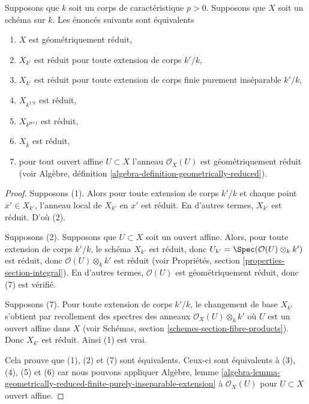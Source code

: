 \begin{lemma}
\label{lemma-geometrically-reduced}
Supposons que $k$ soit un corps de caractéristique $p > 0$. Supposons
que $X$ soit un schéma sur $k$. Les énoncés suivants sont équivalents
\begin{enumerate}
\item $X$ est géométriquement réduit, \item
$X_{k'}$ est réduit pour toute extension de
corps $k'/k$, \item $X_{k'}$ est réduit pour
toute extension de corps finie purement
inséparable $k'/k$, \item $X_{k^{1/p}}$ est
réduit, \item $X_{k^{perf}}$ est réduit, \item
$X_{\bar k}$ est réduit, \item pour tout ouvert
affine $U \subset X$ l'anneau $\mathcal{O}_X(U)$
est géométriquement réduit (voir Algèbre,
définition \ref{algebra-definition-geometrically-reduced}).
\end{enumerate}
\end{lemma}

\begin{proof}
Supposons (1). Alors pour toute extension de corps $k'/k$ et
chaque point $x' \in X_{k'}$, l'anneau local de $X_{k'}$ en $x'$
est réduit. En d'autres termes, $X_{k'}$ est réduit. D'où (2).

\medskip\noindent
Supposons (2). Supposons que $U \subset X$ soit un ouvert affine.
Alors, pour toute extension de corps $k'/k$, le schéma $X_{k'}$
est réduit, donc $U_{k'} = \Spec(\mathcal{O}(U)\otimes_k k')$ est
réduit, donc $\mathcal{O}(U)\otimes_k k'$ est réduit (voir
Propriétés, section \ref{properties-section-integral}). En d'autres
termes, $\mathcal{O}(U)$ est géométriquement réduit, donc (7) est vérifié.

\medskip\noindent
Supposons (7). Pour toute extension de corps $k'/k$, le
changement de base $X_{k'}$ s'obtient par recollement des spectres
des anneaux $\mathcal{O}_X(U) \otimes_k k'$ où $U$ est un
ouvert affine dans $X$ (voir Schémas, section
\ref{schemes-section-fibre-products}). Donc $X_{k'}$ est réduit. Ainsi (1) est vrai.

\medskip\noindent
Cela prouve que (1), (2) et (7) sont équivalents. Ceux-ci sont
équivalents à (3), (4), (5) et (6) car nous pouvons appliquer
Algèbre, lemme
\ref{algebra-lemma-geometrically-reduced-finite-purely-inseparable-extension} à $\mathcal{O}_X(U)$ pour $U \subset X$ ouvert affine.
\end{proof}


